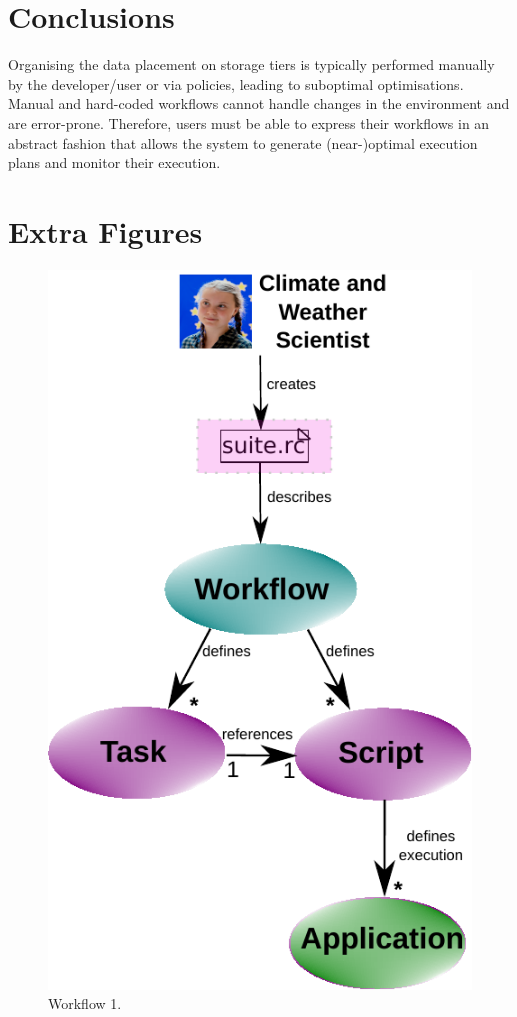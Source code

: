 \documentclass[a4paper]{article}
\begin{document}
\section{Conclusions}
\label{sec:conclusions}

Organising the data placement on storage tiers is typically performed manually by the developer/user or via policies, leading to suboptimal optimisations.
Manual and hard-coded workflows cannot handle changes in the environment and are error-prone.
Therefore, users must be able to express their workflows in an abstract fashion that allows the system to generate (near-)optimal execution plans and monitor their execution.

\section{Extra Figures}


\begin{figure}[H]
  \centering
  \includegraphics[scale=0.6]{workflow1-v2}
  \caption{Workflow 1.}
  \label{fig:work1}
\end{figure}
\end{document}
